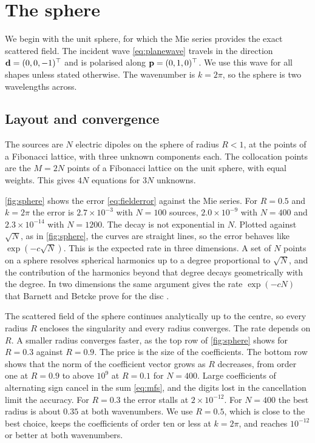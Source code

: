 \section{The sphere}
\label{sec:sphere}

We begin with the unit sphere, for which the Mie series provides the exact scattered field. The incident wave \eqref{eq:planewave} travels in the direction $\mathbf{d} = (0,0,-1)^\top$ and is polarised along $\mathbf{p} = (0,1,0)^\top$. We use this wave for all shapes unless stated otherwise. The wavenumber is $k = 2\pi$, so the sphere is two wavelengths across.

\subsection{Layout and convergence}

The sources are $N$ electric dipoles on the sphere of radius $R<1$, at the points of a Fibonacci lattice, with three unknown components each. The collocation points are the $M = 2N$ points of a Fibonacci lattice on the unit sphere, with equal weights. This gives $4N$ equations for $3N$ unknowns.

\autoref{fig:sphere} shows the error \eqref{eq:fielderror} against the Mie series. For $R = 0.5$ and $k = 2\pi$ the error is $2.7\times10^{-3}$ with $N = 100$ sources, $2.0\times10^{-9}$ with $N = 400$ and $2.3\times10^{-14}$ with $N = 1200$. The decay is not exponential in $N$. Plotted against $\sqrt{N}$, as in \autoref{fig:sphere}, the curves are straight lines, so the error behaves like $\exp(-c\sqrt{N})$. This is the expected rate in three dimensions. A set of $N$ points on a sphere resolves spherical harmonics up to a degree proportional to $\sqrt{N}$, and the contribution of the harmonics beyond that degree decays geometrically with the degree. In two dimensions the same argument gives the rate $\exp(-cN)$ that Barnett and Betcke prove for the disc \cite{barnett2008}.

The scattered field of the sphere continues analytically up to the centre, so every radius $R$ encloses the singularity and every radius converges. The rate depends on $R$. A smaller radius converges faster, as the top row of \autoref{fig:sphere} shows for $R = 0.3$ against $R = 0.9$. The price is the size of the coefficients. The bottom row shows that the norm of the coefficient vector grows as $R$ decreases, from order one at $R = 0.9$ to above $10^{9}$ at $R = 0.1$ for $N = 400$. Large coefficients of alternating sign cancel in the sum \eqref{eq:mfs}, and the digits lost in the cancellation limit the accuracy. For $R = 0.3$ the error stalls at $2\times10^{-12}$. For $N = 400$ the best radius is about $0.35$ at both wavenumbers. We use $R = 0.5$, which is close to the best choice, keeps the coefficients of order ten or less at $k = 2\pi$, and reaches $10^{-12}$ or better at both wavenumbers.


